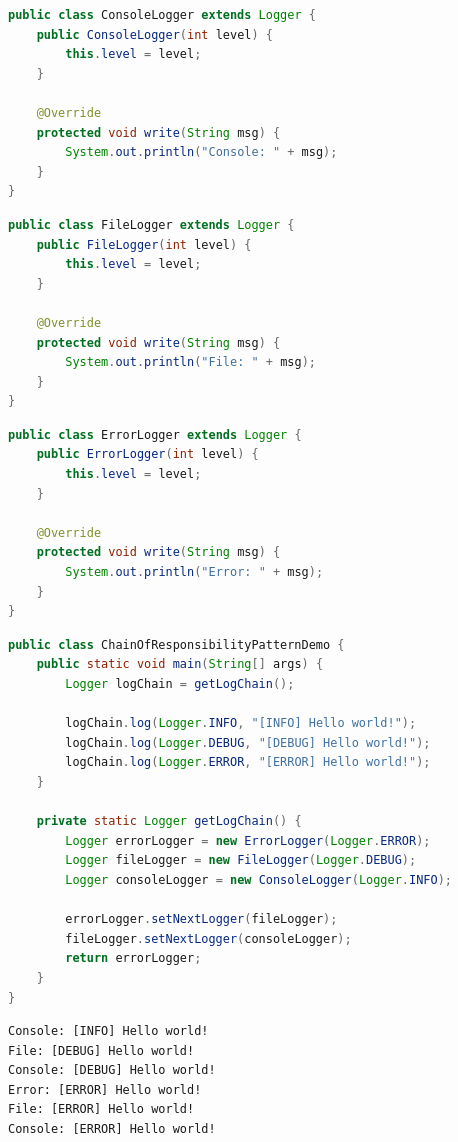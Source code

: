 \begin{lstlisting}[language=Java, title=ConsoleLogger.java]
public class ConsoleLogger extends Logger {
    public ConsoleLogger(int level) {
        this.level = level;
    }

    @Override
    protected void write(String msg) {
        System.out.println("Console: " + msg);
    }
}
\end{lstlisting}

\begin{lstlisting}[language=Java, title=FileLogger.java]
public class FileLogger extends Logger {
    public FileLogger(int level) {
        this.level = level;
    }

    @Override
    protected void write(String msg) {
        System.out.println("File: " + msg);
    }
}
\end{lstlisting}

\begin{lstlisting}[language=Java, title=ErrorLogger.java]
public class ErrorLogger extends Logger {
    public ErrorLogger(int level) {
        this.level = level;
    }

    @Override
    protected void write(String msg) {
        System.out.println("Error: " + msg);
    }
}
\end{lstlisting}

\begin{lstlisting}[language=Java, title=ChainOfResponsibilityPatternDemo.java]
public class ChainOfResponsibilityPatternDemo {
    public static void main(String[] args) {
        Logger logChain = getLogChain();

        logChain.log(Logger.INFO, "[INFO] Hello world!");
        logChain.log(Logger.DEBUG, "[DEBUG] Hello world!");
        logChain.log(Logger.ERROR, "[ERROR] Hello world!");
    }

    private static Logger getLogChain() {
        Logger errorLogger = new ErrorLogger(Logger.ERROR);
        Logger fileLogger = new FileLogger(Logger.DEBUG);
        Logger consoleLogger = new ConsoleLogger(Logger.INFO);

        errorLogger.setNextLogger(fileLogger);
        fileLogger.setNextLogger(consoleLogger);
        return errorLogger;
    }
}
\end{lstlisting}

\begin{tcolorbox}
    \begin{verbatim}
Console: [INFO] Hello world!
File: [DEBUG] Hello world!
Console: [DEBUG] Hello world!
Error: [ERROR] Hello world!
File: [ERROR] Hello world!
Console: [ERROR] Hello world!
\end{verbatim}
\end{tcolorbox}

